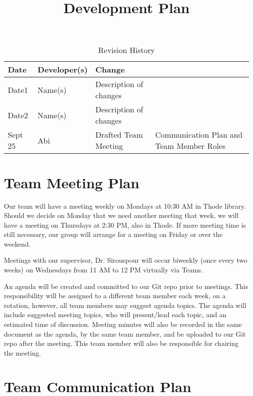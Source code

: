 \documentclass{article}
\title{Development Plan\\\progname}
\author{\authname}
\date{}
\begin{document}
\begin{table}[hp]
\caption{Revision History} \label{TblRevisionHistory}
\begin{tabularx}{\textwidth}{llX}
\toprule
\textbf{Date} & \textbf{Developer(s)} & \textbf{Change}\\
\midrule
Date1 & Name(s) & Description of changes\\
Date2 & Name(s) & Description of changes\\
Sept 25 & Abi & Drafted Team Meeting & Communication Plan and Team Member Roles\\
\bottomrule
\end{tabularx}
\end{table}

\newpage

\maketitle


\section{Team Meeting Plan}

Our team will have a meeting weekly on Mondays at 10:30 AM in Thode library.  Should we decide on Monday that we need another meeting that week, we will have a meeting on Thursdays at 2:30 PM, also in Thode.  If more meeting time is still necessary, our group will arrange for a meeting on Friday or over the weekend. 

Meetings with our supervisor, Dr. Sirouspour will occur biweekly (once every two weeks) on Wednesdays from 11 AM to 12 PM virtually via Teams. 

An agenda will be created and committed to our Git repo prior to meetings.  This responsibility will be assigned to a different team member each week, on a rotation, however, all team members may suggest agenda topics.  The agenda will include suggested meeting topics, who will present/lead each topic, and an estimated time of discussion. Meeting minutes will also be recorded in the same document as the agenda, by the same team member, and be uploaded to our Git repo after the meeting.  This team member will also be responsible for chairing the meeting. 

\section{Team Communication Plan}
\end{document}
